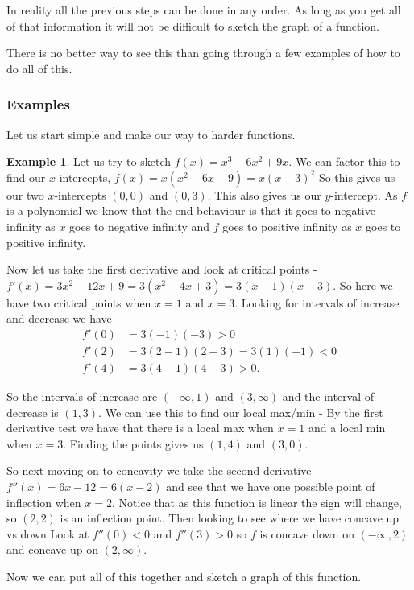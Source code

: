 \documentclass[12pt,reqno]{article}
\theoremstyle{definition}
\newtheorem*{Example}{Example}
\begin{document}
In reality all the previous steps can be done in any order. As long as you get all of that information it will not be difficult to sketch the graph of a function. 

There is no better way to see this than going through a few examples of how to do all of this. 
\subsubsection{Examples}
Let us start simple and make our way to harder functions. 
\begin{Example}
 Let us try to sketch $f(x) = x^3 -6x^2 + 9x$. We can factor this to find our $x$-intercepts, $f(x) = x(x^2 - 6x + 9) = x(x - 3)^2$ So this gives us our two $x$-intercepts $(0, 0)$ and $(0, 3)$. This also gives us our $y$-intercept. As $f$ is a polynomial we know that the end behaviour is that it goes to negative infinity as $x$ goes to negative infinity and $f$ goes to positive infinity as $x$ goes to positive infinity. 
 
 Now let us take the first derivative and look at critical points - $f'(x) = 3x^2 - 12x + 9 = 3 (x^2 - 4x + 3) = 3(x - 1)(x - 3)$. So here we have two critical points when $x = 1$ and $x = 3$. Looking for intervals of increase and decrease we have 
 \begin{align*}
 	f'(0) &= 3(- 1)(-3) > 0 \\
	f'(2) &= 3(2 - 1)(2 -3) = 3(1)(-1) < 0 \\
	f'(4) &= 3(4 - 1)(4 - 3) > 0.
\end{align*}

So the intervals of increase are $(-\infty, 1)$ and $(3, \infty)$ and the interval of decrease is $(1, 3)$. We can use this to find our local max/min  - By the first derivative test we have that there is a local max when $x = 1$ and a local min when $x = 3$. Finding the points gives us $(1, 4)$ and $(3, 0)$. 

So next moving on to concavity we take the second derivative - $f''(x) = 6x - 12 = 6(x - 2)$ and see that we have one possible point of inflection when $x = 2$. Notice that as this function is linear the sign will change, so $(2, 2)$ is an inflection point. Then looking to see where we have concave up vs down Look at $f''(0) < 0$ and $f''(3) > 0$ so $f$ is concave down on $(-\infty, 2)$ and concave up on $(2, \infty)$. 

Now we can put all of this together and sketch a graph of this function. 

\end{Example}
\end{document}
